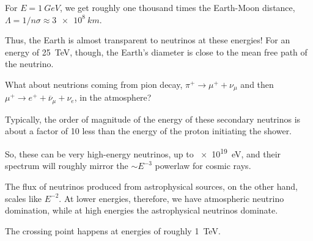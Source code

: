 \documentclass[main.tex]{subfiles}
\begin{document}
For \(E = \SI{1}{GeV}\), we get roughly one thousand times the Earth-Moon distance, \(\Lambda = 1/  n \sigma \approx \SI{3e8}{km}\).

Thus, the Earth is almost transparent to neutrinos at these energies! 
For an energy of \SI{25}{TeV}, though, the Earth's diameter is close to the mean free path of the neutrino.

What about neutrions coming from pion decay, \(\pi^{+} \to \mu^{+} + \nu _\mu \) and then \(\mu^{+} \to e^{+} + \overline{\nu} _\mu  + \nu _e\), in the atmosphere? 

Typically, the order of magnitude of the energy of these secondary neutrinos is about a factor of 10 less than the energy of the proton initiating the shower. 

So, these can be very high-energy neutrinos, up to \SI{e19}{eV}, and their spectrum will roughly mirror the \(\sim E^{-3}\) powerlaw for cosmic rays. 

The flux of neutrinos produced from astrophysical sources, on the other hand, scales like \(E^{-2}\). 
At lower energies, therefore, we have atmospheric neutrino domination, while at high energies the astrophysical neutrinos dominate. 

The crossing point happens at energies of roughly \SI{1}{TeV}. 
\end{document}

